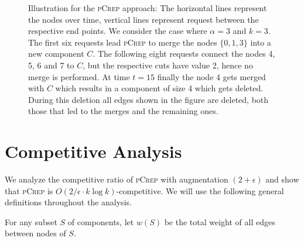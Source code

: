 \documentclass[a4paper,UKenglish,cleveref, autoref, thm-restate,authorcolumns]{lipics-v2019}
\newcommand{\adjDel}{\textsc{pCrep}}
\newcommand{\request}[3]{\draw (axis cs:#3,#1) -- node[left]{} (axis cs:#3,#2);}
\begin{document}
\begin{figure}
	\centering
	\caption{Illustration for the \adjDel{} approach: The horizontal lines represent the nodes over time, vertical lines represent request between the respective end points.  We consider the case where $\alpha=3$ and $k=3$.
	The first six requests lead \adjDel{} to merge the nodes $\{0,1,3\}$ into
	a new component $C$. The following eight requests connect the nodes 4, 5, 6 and 7 to $C$,
	but the respective cuts have value 2, hence no merge is performed. At time $t=15$ finally the node 4 gets merged with $C$ which results in a component of size 4 which gets deleted.
	During this deletion all edges shown in the figure are deleted, both those that led to the merges and the remaining ones.}\label{exOldCrep}
	
\end{figure}		

\section{Competitive Analysis}
\label{comp_analysis_section}

We analyze the competitive ratio of \adjDel{} with augmentation $(2+\epsilon)$ and show that \adjDel{} is $O(2/\epsilon\cdot k\log k)$-competitive.
We will use the following general definitions 
throughout the analysis.

\begin{definition}
	For any subset $S$ of components, let $w(S)$ be 
	the total weight of all edges between nodes of $S$.
\end{definition}
\end{document}
